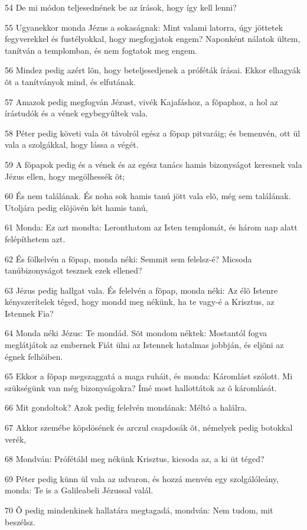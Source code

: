 \par 54 De mi módon teljesednének be az írások, hogy így kell lenni?
\par 55 Ugyanekkor monda Jézus a sokaságnak: Mint valami latorra, úgy jöttetek fegyverekkel és fustélyokkal, hogy megfogjatok engem? Naponként nálatok ültem, tanítván a templomban, és nem fogtatok meg engem.
\par 56 Mindez pedig azért lõn, hogy beteljesedjenek a próféták írásai. Ekkor elhagyák õt a tanítványok mind, és elfutának.
\par 57 Amazok pedig megfogván Jézust, vivék Kajafáshoz, a fõpaphoz, a hol az írástudók és a vének egybegyûltek vala.
\par 58 Péter pedig követi vala õt távolról egész a fõpap pitvaráig; és bemenvén, ott ül vala a szolgákkal, hogy lássa a végét.
\par 59 A fõpapok pedig és a vének és az egész tanács hamis bizonyságot keresnek vala Jézus ellen, hogy megölhessék õt;
\par 60 És nem találának. És noha sok hamis tanú jött vala elõ, még sem találának. Utoljára pedig elõjövén két hamis tanú,
\par 61 Monda: Ez azt mondta: Leronthatom az Isten templomát, és három nap alatt felépíthetem azt.
\par 62 És fölkelvén a fõpap, monda néki: Semmit sem felelsz-é? Micsoda tanúbizonyságot tesznek ezek ellened?
\par 63 Jézus pedig hallgat vala. És felelvén a fõpap, monda néki: Az élõ Istenre kényszerítelek téged, hogy mondd meg nékünk, ha te vagy-é a Krisztus, az Istennek Fia?
\par 64 Monda néki Jézus: Te mondád. Sõt mondom néktek: Mostantól fogva meglátjátok az embernek Fiát ülni az Istennek hatalmas jobbján, és eljõni az égnek felhõiben.
\par 65 Ekkor a fõpap megszaggatá a maga ruháit, és monda: Káromlást szólott. Mi szükségünk van még bizonyságokra? Ímé most hallottátok az õ káromlását.
\par 66 Mit gondoltok? Azok pedig felelvén mondának: Méltó a halálra.
\par 67 Akkor szemébe köpdösének és arczul csapdosák õt, némelyek pedig botokkal verék,
\par 68 Mondván: Prófétáld meg nékünk Krisztus, kicsoda az, a ki üt téged?
\par 69 Péter pedig künn ül vala az udvaron, és hozzá menvén egy szolgálóleány, monda: Te is a Galileabeli Jézussal valál.
\par 70 Õ pedig mindenkinek hallatára megtagadá, mondván: Nem tudom, mit beszélsz.
